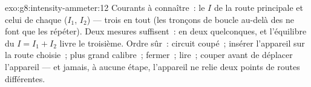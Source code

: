 \begin{solution}{exo:g8:intensity-ammeter:12}
Courants à connaître~: le $I$ de la route principale et celui de
chaque  ($I_1$, $I_2$) --- trois en tout (les tronçons de
boucle au-delà des  ne font que les répéter). Deux mesures
suffisent~: en  deux quelconques, et l'équilibre du 
$I = I_1 + I_2$ livre le troisième. Ordre sûr~: circuit coupé~;
insérer l'appareil sur la route choisie~; plus grand calibre~;
fermer~; lire~; couper avant de déplacer l'appareil --- et jamais,
à aucune étape, l'appareil ne relie deux points de routes
différentes.
\end{solution}

